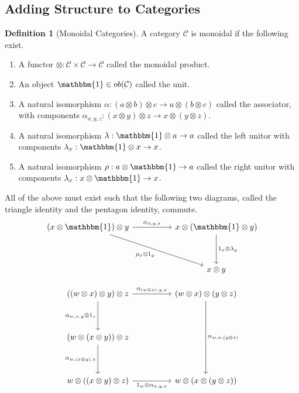 \documentclass{article}
\theoremstyle{definition}
\newtheorem{definition}{Definition}
\begin{document}
\subsection*{Adding Structure to Categories}
\begin{definition}[Monoidal Categories]
    A category $\mathcal{C}$ is monoidal if the following exist.
    \begin{enumerate}
        \item A functor $\otimes:\mathcal{C}\times\mathcal{C}\rightarrow\mathcal{C}$ called the monoidal product.
        \item An object $\mathbbm{1}\in ob(\mathcal{C})$ called the unit.
        \item A natural isomorphism $\alpha : (a\otimes b)\otimes c\rightarrow a\otimes (b\otimes c)$ called the associator, with components $\alpha_{x,y,z}: (x\otimes y)\otimes z\rightarrow x\otimes (y\otimes z)$.
        \item A natural isomorphism $\lambda : \mathbbm{1}\otimes a\rightarrow a$ called the left unitor with components $\lambda_x : \mathbbm{1}\otimes x\rightarrow x$.
        \item A natural isomorphism $\rho : a\otimes \mathbbm{1}\rightarrow a$ called the right unitor with components $\lambda_x : x\otimes \mathbbm{1}\rightarrow x$.
    \end{enumerate}
    All of the above must exist such that the following two diagrams, called the triangle identity and the pentagon identity, commute.
    \[\begin{tikzcd}
            {(x\otimes\mathbbm{1})\otimes y} && {x\otimes(\mathbbm{1}\otimes y)} \\
            \\
            && {x\otimes y}
            \arrow["{{\rho_x\otimes 1_y}}"', from=1-1, to=3-3]
            \arrow["{{1_x\otimes\lambda_y}}", from=1-3, to=3-3]
            \arrow["{{\alpha_{x,y,z}}}", from=1-1, to=1-3]
        \end{tikzcd}\]

    \[\begin{tikzcd}
            {((w\otimes x)\otimes y)\otimes z} && {(w\otimes x)\otimes(y\otimes z)} \\
            \\
            {(w\otimes (x\otimes y))\otimes z} \\
            \\
            {w\otimes ((x\otimes y)\otimes z)} && {w\otimes (x\otimes (y\otimes z))}
            \arrow["{{\alpha_{w,x,(y\otimes z)}}}", from=1-3, to=5-3]
            \arrow["{{\alpha_{(w\otimes x),y,z}}}", from=1-1, to=1-3]
            \arrow["{{\alpha_{w,x,y}\otimes 1_z}}"', from=1-1, to=3-1]
            \arrow["{{\alpha_{w,(x\otimes y),z}}}"', from=3-1, to=5-1]
            \arrow["{{1_w\otimes \alpha_{x,y,z}}}"', from=5-1, to=5-3]
        \end{tikzcd}\]
\end{definition}
\end{document}
